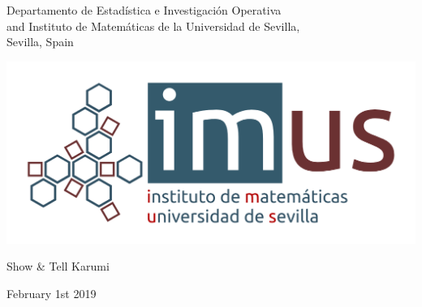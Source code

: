 \documentclass[11pt,a4paper,xcolor=dvipsnames, leqno]{beamer}
\begin{document}
\begingroup 
    \begin{frame}
        \titlepage
\begin{center}
\insertauthor\par
\end{center}
\begin{center}
        \scriptsize Departamento de Estad\'istica e Investigaci\'on Operativa\\ and Instituto de Matem\'aticas de la Universidad de Sevilla,\\
        Sevilla, Spain
        \end{center}
\begin{center}
\LARGE {}
\end{center}
\begin{center}
\includegraphics[scale=0.35]{imus_basico_oct.png}
\end{center}
\begin{center}
\scriptsize{Show \& Tell Karumi}
\end{center}
\begin{center}
\footnotesize{February 1st 2019}
\end{center}
\end{frame}
\endgroup
\end{document}
